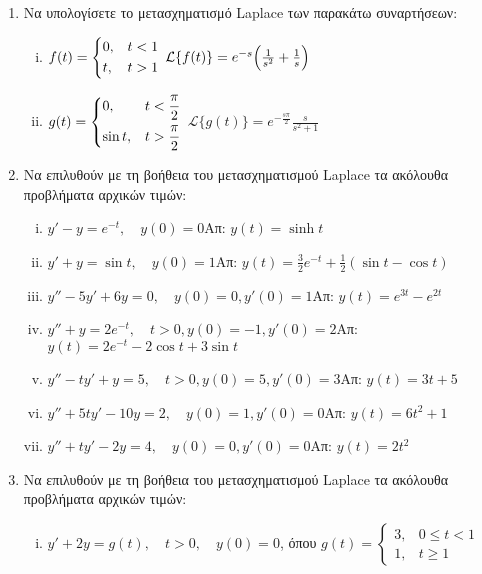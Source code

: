 \begin{enumerate}
  \item Να υπολογίσετε το μετασχηματισμό Laplace των παρακάτω συναρτήσεων:

    \begin{enumerate}[i)]
      \item $f(t)=\begin{dcases} 0, & t<1 \\ t, & t>1 \end{dcases}$ \hfill 
        $\mathcal{L}\{f(t)\}=e^{-s}\Bigl(\frac{1}{s^2}+\frac{1}{s}\Bigr)$
      \item $g(t)=\begin{dcases} 0, & t<\frac{\pi}{2} \\ \sin t, & t>\frac{\pi}{2} 
        \end{dcases}$ \hfill $\mathcal{L}\{g(t)\}=e^{-\frac{s\pi}{2}}\frac{s}{s^2+1}$
    \end{enumerate}

  \item Να επιλυθούν με τη βοήθεια του μετασχηματισμού Laplace τα ακόλουθα προβλήματα 
    αρχικών τιμών:

    \begin{enumerate}[i)]
      \item $y'-y=e^{-t},\quad y(0)=0$\hfill Απ: $y(t)=\sinh t$
      \item $y'+y=\sin t,\quad y(0)=1$\hfill Απ: $y(t)=\frac{3}{2}e^{-t}+
        \frac{1}{2}(\sin t-\cos t)$
      \item $y''-5y'+6y=0,\quad y(0)=0, y'(0)=1$\hfill Απ: $y(t)=e^{3t}-e^{2t}$
      \item $y''+y=2e^{-t},\quad t>0, y(0)=-1, y'(0)=2$\hfill Απ: $y(t)=2e^{-t}-2\cos t+3
        \sin t$
      \item $y''-ty'+y=5, \quad t>0, y(0)=5, y'(0)=3$\hfill Απ: $y(t)=3t+5$
      \item $y'' +5ty'-10y=2, \quad y(0)=1, y'(0)=0$\hfill Απ: $y(t)=6t^2+1$
      \item $y'' +ty'-2y=4, \quad y(0)=0, y'(0)=0$\hfill Απ: $y(t)=2t^2$
    \end{enumerate}

  \item Να επιλυθούν με τη βοήθεια του μετασχηματισμού Laplace τα ακόλουθα προβλήματα 
    αρχικών τιμών:

    \begin{enumerate}[i)]
      \item $y'+2y=g(t),\quad t>0,\quad y(0)=0$, όπου $g(t)=\begin{cases}3, & 
          0\leq t<1 \\ 1, & t\geq 1\end{cases}$


\end{enumerate}
\end{enumerate}
